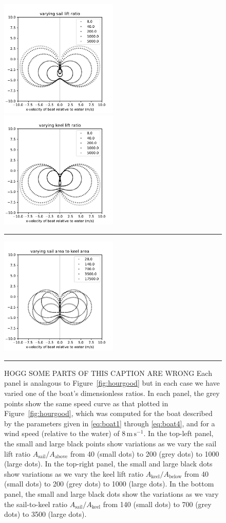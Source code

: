 \documentclass[letterpaper]{article}
\newcommand{\sail}{\text{sail}}
\newcommand{\keel}{\text{keel}}
\renewcommand{\above}{\text{above}}
\newcommand{\below}{\text{below}}
\newcommand{\mps}{\mathrm{m\,s^{-1}}}
\newcommand{\figref}[1]{Figure~\ref{#1}}
\newcommand{\figurerule}{\rule[1ex]{\textwidth}{0.2pt}}
\begin{document}
\begin{figure}[t!]
  \includegraphics[width=0.5\textwidth]{design_A.pdf}%
  \includegraphics[width=0.5\textwidth]{design_C.pdf}\\%
  \rule{0.25\textwidth}{0pt}\includegraphics[width=0.5\textwidth]{design_E.pdf}
  \caption{HOGG SOME PARTS OF THIS CAPTION ARE WRONG Each panel is analagous to \figref{fig:hourgood} but in each case we have varied one of the boat's dimensionless ratios. In each panel, the grey points show the same speed curve as that plotted in \figref{fig:hourgood}, which was computed for the boat described by the parameters given in \eqref{eq:boat1} through \eqref{eq:boat4}, and for a wind speed (relative to the water) of $8\,\mps$.
  In the top-left panel, the small and large black points show variations as we vary the sail lift ratio $A_\sail/A_\above$ from 40 (small dots) to 200 (grey dots) to 1000 (large dots).
  In the top-right panel, the small and large black dots show variations as we vary the keel lift ratio $A_\keel/A_\below$ from 40 (small dots) to 200 (grey dots) to 1000 (large dots).
  In the bottom panel, the small and large black dots show the variations as we vary the sail-to-keel ratio $A_\sail/A_\keel$ from 140 (small dots) to 700 (grey dots) to 3500 (large dots).\label{fig:design}}
  \figurerule
\end{figure}
\end{document}
